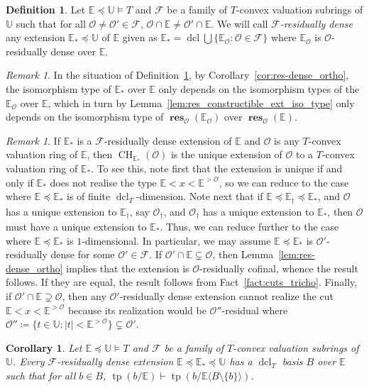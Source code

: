 \documentclass{amsart}
\newtheorem{corollary}[theorem]{Corollary}
\theoremstyle{remark}
\newtheorem{remark}[theorem]{Remark}
\theoremstyle{definition}
\newtheorem{definition}[theorem]{Definition}
\theoremstyle{plain}
\newcommand{\bE}{\mathbb E}
\newcommand{\bU}{\mathbb U}
\newcommand{\cF}{\mathcal F}
\newcommand{\cO}{\mathcal O}
\DeclareMathOperator{\res}{\mathbf{res}}
\DeclareMathOperator{\tp}{\mathrm{tp}}
\DeclareMathOperator{\dcl}{\mathrm{dcl}}
\DeclareMathOperator{\CH}{\mathrm{CH}}
\theoremstyle{plain}
\begin{document}
\begin{definition}\label{def:F-res-dense}
    Let $\bE \preceq \bU \models T$ and $\cF$ be a family of $T$-convex valuation subrings of $\bU$ such that for all $\cO\neq \cO' \in \cF$, $\cO \cap \bE \neq \cO' \cap \bE$. We will call \emph{$\cF$-residually dense} any extension $\bE_*\preceq \bU$ of $\bE$ given as $\bE_*=\dcl \bigcup\{ \bE_\cO: \cO \in \cF\}$ where $\bE_\cO$ is $\cO$-residually dense over $\bE$.
\end{definition}

\begin{remark}\label{rmk:F-res-dense_iso_type}
    In the situation of Definition~\ref{def:F-res-dense}, by Corollary~\ref{cor:res-dense_ortho}, the isomorphism type of $\bE_*$ over $\bE$ only depends on the isomorphism types of the $\bE_\cO$ over $\bE$, which in turn by Lemma~\ref{lem:res_constructible_ext_iso_type} only depends on the isomorphism type of $\res_{\cO}(\bE_\cO)$ over $\res_{\cO}(\bE)$.
\end{remark}

\begin{remark}
    If $\bE_*$ is a $\cF$-residually dense extension of $\bE$ and $\cO$ is any $T$-convex valuation ring of $\bE$, then $\CH_{\bE_*}(\cO)$ is the unique extension of $\cO$ to a $T$-convex valuation ring of $\bE_*$.
    To see this, note first that the extension is unique if and only if $\bE_*$ does not realise the type $\bE < x < \bE^{>\cO}$, so we can reduce to the case where $\bE \preceq \bE_*$ is of finite $\dcl_T$-dimension. Note next that if $\bE \preceq \bE_\dagger \preceq \bE_*$, and $\cO$ has a unique extension to $\bE_\dagger$, say $\cO_\dagger$, and $\cO_\dagger$ has a unique extension to $\bE_*$, then $\cO$ must have a unique extension to $\bE_*$. Thus, we can reduce further to the case where $\bE\preceq \bE_*$ is $1$-dimensional. In particular, we may assume $\bE\preceq \bE_*$ is $\cO'$-residually dense for some $\cO' \in \cF$. If $\cO' \cap \bE \subsetneq \cO$, then Lemma~\ref{lem:res-dense_ortho} implies that the extension is $\cO$-residually cofinal, whence the result follows. If they are equal, the result follows from Fact~\ref{fact:cuts_tricho}. Finally, if $\cO' \cap \bE \supsetneq \cO$, then any $\cO'$-residually dense extension cannot realize the cut $\bE < x < \bE^{>\cO}$ because its realization would be $\cO''$-residual where $\cO''\coloneqq \{t \in \bU: |t|< \bE^{>\cO}\}\subsetneq \cO'$.
\end{remark}

\begin{corollary}\label{cor:type_orthogonal_basis}
    Let $\bE \preceq \bU \models T$ and $\cF$ be a family of $T$-convex valuation subrings of $\bU$. Every $\mathcal{F}$-residually dense extension $\bE \preceq \bE_*\preceq \bU$ has a $\dcl_T$ basis $B$ over $\bE$ such that for all $b \in B$, $\tp(b/\bE)\vdash \tp(b/\bE \langle B \setminus \{b\} \rangle)$.
\end{corollary}
\end{document}
